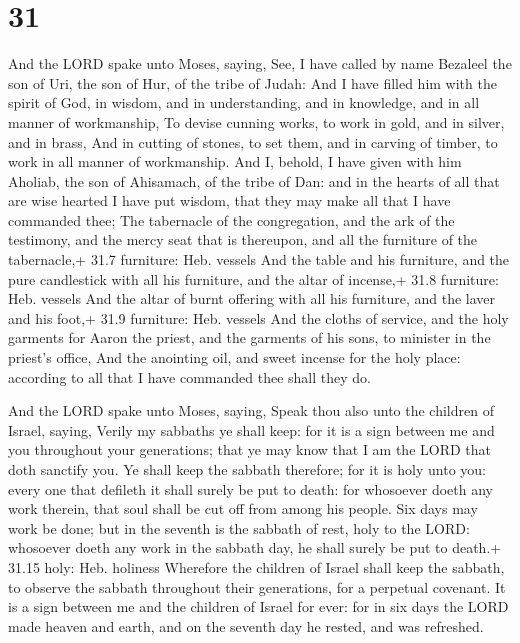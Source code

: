 \hypertarget{section-30}{%
\section{31}\label{section-30}}

 And the LORD spake unto Moses, saying,  See, I
have called by name Bezaleel the son of Uri, the son of Hur, of the
tribe of Judah:  And I have filled him with the spirit of
God, in wisdom, and in understanding, and in knowledge, and in all
manner of workmanship,  To devise cunning works, to work in
gold, and in silver, and in brass,  And in cutting of
stones, to set them, and in carving of timber, to work in all manner of
workmanship.  And I, behold, I have given with him Aholiab,
the son of Ahisamach, of the tribe of Dan: and in the hearts of all that
are wise hearted I have put wisdom, that they may make all that I have
commanded thee;  The tabernacle of the congregation, and the
ark of the testimony, and the mercy seat that is thereupon, and all the
furniture of the tabernacle,+ 31.7 furniture: Heb. vessels 
And the table and his furniture, and the pure candlestick with all his
furniture, and the altar of incense,+ 31.8 furniture: Heb. vessels
 And the altar of burnt offering with all his furniture, and
the laver and his foot,+ 31.9 furniture: Heb. vessels  And
the cloths of service, and the holy garments for Aaron the priest, and
the garments of his sons, to minister in the priest's office,
 And the anointing oil, and sweet incense for the holy
place: according to all that I have commanded thee shall they do.

 And the LORD spake unto Moses, saying, 
Speak thou also unto the children of Israel, saying, Verily my sabbaths
ye shall keep: for it is a sign between me and you throughout your
generations; that ye may know that I am the LORD that doth sanctify you.
 Ye shall keep the sabbath therefore; for it is holy unto
you: every one that defileth it shall surely be put to death: for
whosoever doeth any work therein, that soul shall be cut off from among
his people.  Six days may work be done; but in the seventh
is the sabbath of rest, holy to the LORD: whosoever doeth any work in
the sabbath day, he shall surely be put to death.+ 31.15 holy: Heb.
holiness  Wherefore the children of Israel shall keep the
sabbath, to observe the sabbath throughout their generations, for a
perpetual covenant.  It is a sign between me and the
children of Israel for ever: for in six days the LORD made heaven and
earth, and on the seventh day he rested, and was refreshed.

